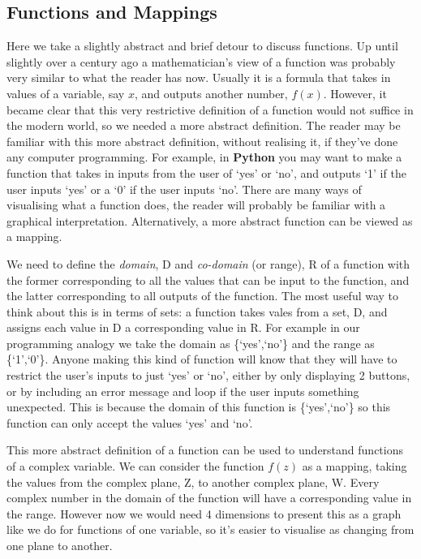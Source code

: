 \subsection{Functions and Mappings}
Here we take a slightly abstract and brief detour to discuss functions.
 Up until slightly over a century ago a mathematician's view of a function was probably very similar to what the reader has now.
 Usually it is a formula that takes in values of a variable, say $x$, and outputs another number, $f(x)$.
 However, it became clear that this very restrictive definition of a function would not suffice in the modern world, so we needed a more abstract definition.
 The reader may be familiar with this more abstract definition, without realising it, if they've done any computer programming.
 For example, in \textbf{Python} you may want to make a function that takes in inputs from the user of `yes' or `no', and outputs `1' if the user inputs `yes' or a `0' if the user inputs `no'.
 There are many ways of visualising what a function does, the reader will probably be familiar with a graphical interpretation.
 Alternatively, a more abstract function can be viewed as a mapping. 
\par     
We need to define the \emph{domain}, D and \emph{co-domain} (or range), R of a function with the former corresponding to all the values that can be input to the function, and the latter corresponding to all outputs of the function.
 The most useful way to think about this is in terms of sets: a function takes vales from a set, D, and assigns each value in D a corresponding value in R.
 For example in our programming analogy we take the domain as \{`yes',`no'\} and the range as \{`1',`0'\}. 
 Anyone making this kind of function will know that they will have to restrict the user's inputs to just `yes' or `no', either by only displaying 2 buttons, or by including an error message and loop if the user inputs something unexpected.
 This is because the domain of this function is \{`yes',`no'\} so this function can only accept the values `yes' and `no'.
\par 
This more abstract definition of a function can be used to understand functions of a complex variable.
 We can consider the function $f(z)$ as a mapping, taking the values from the complex plane, Z, to another complex plane, W.
 Every complex number in the domain of the function will have a corresponding value in the range. However now we would need 4 dimensions to present this as a graph like we do for functions of one variable, so it's easier to visualise as changing from one plane to another.
